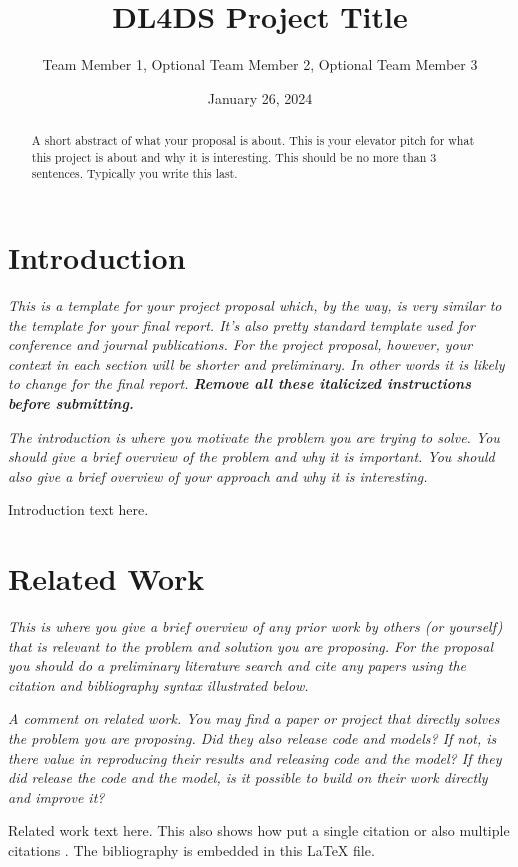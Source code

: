 \documentclass[11pt, oneside]{article}   	%
\title{DL4DS Project Title}
\author{Team Member 1, Optional Team Member 2, Optional Team Member 3}
\date{January 26, 2024}		%
\begin{document}
\maketitle
\begin{abstract}
A short abstract of what your proposal is about. This is your elevator pitch
for what this project is about and why it is interesting. This should be no
more than 3 sentences. Typically you write this last.
\end{abstract}

\section*{Introduction}

\textit{This is a template for your project proposal which, by the way, 
is very similar to the template for your final report. It's also pretty
standard template used for conference and journal publications. For the
project proposal, however, your context in each section will be shorter
and preliminary. In other words it is likely to change for the final
report.  
\textbf{Remove all these italicized instructions before submitting.}}

\textit{The introduction is where you motivate the problem you are trying
to solve. You should give a brief overview of the problem and why it is
important. You should also give a brief overview of your approach and
why it is interesting.}

Introduction text here.

\section*{Related Work}

\textit{This is where you give a brief overview of any prior work by
others (or yourself) that is relevant to the problem and solution you
are proposing. For the proposal you should do a preliminary literature search
and cite any papers using the citation and bibliography syntax illustrated
below.}

\textit{A comment on related work. You may find a paper or project that
directly solves the problem you are proposing. Did they also release code and
models? If not, is there value in reproducing their results and releasing
code and the model? 
If they did release the code and the model, is it possible to build
on their work directly and improve it?}

Related work text here. This also shows how put a single 
citation \cite{citation_key1} or also multiple citations
\cite{citation_key1,citation_key2}.  The bibliography is embedded
in this \LaTeX \hspace*{1pt} file.
\end{document}
